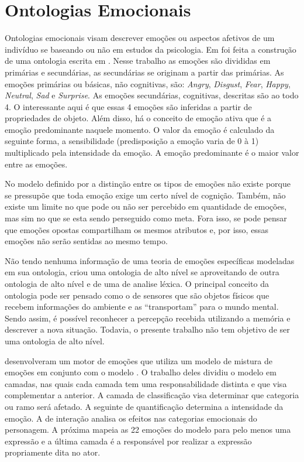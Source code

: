 \section{Ontologias Emocionais} \label{cap:eda:oe}

Ontologias emocionais visam descrever emoções ou aspectos afetivos de um
indivíduo se baseando ou não em estudos da psicologia. Em
\citet{benta2007ontology} foi feita a construção de uma ontologia escrita em
\OWL. Nesse trabalho as emoções são divididas em primárias e secundárias, as
secundárias se originam a partir das primárias. As emoções primárias ou
básicas, não cognitivas, são: \emph{Angry}, \emph{Disgust}, \emph{Fear},
\emph{Happy}, \emph{Neutral}, \emph{Sad} e \emph{Surprise}. As emoções
secundárias, cognitivas, descritas são ao todo 4. O interessante aqui é que
essas 4 emoções são inferidas a partir de propriedades de objeto. Além disso,
há o conceito de emoção ativa que é a emoção predominante naquele momento. O
valor da emoção é calculado da seguinte forma, a sensibilidade (predisposição
a emoção varia de 0 à 1) multiplicado pela intensidade da emoção. A emoção
predominante é o maior valor entre as emoções.

No modelo definido por \citet{ortony1988cse} a distinção entre os tipos de
emoções não existe porque se pressupõe que toda emoção exige um certo nível de
cognição. Também, não existe um limite no que pode ou não ser percebido em
quantidade de emoções, mas sim no que se esta sendo perseguido como meta. Fora
isso, se pode pensar que emoções opostas compartilham os mesmos atributos e,
por isso, essas emoções não serão sentidas ao mesmo tempo.

Não tendo nenhuma informação de uma teoria de emoções específicas modeladas em
sua ontologia, \citet{wks2008towards} criou uma ontologia de alto nível se
aproveitando de outra ontologia de alto nível e de uma de analise léxica. O
principal conceito da ontologia pode ser pensado como o de sensores que são
objetos físicos que recebem informações do ambiente e as ``transportam'' para
o mundo mental. Sendo assim, é possível reconhecer a percepção recebida
utilizando a memória e descrever a nova situação. Todavia, o presente trabalho
não tem objetivo de ser uma ontologia de alto nível\dev{}.

\citet{springerlink:10.1007/978-3-642-01639-448} desenvolveram um motor de
emoções que utiliza um modelo de mistura de emoções em conjunto com o modelo
\occ. O trabalho deles dividiu o modelo em camadas, nas quais cada camada tem
uma responsabilidade distinta e que visa complementar a anterior. A
camada de classificação visa determinar que categoria ou ramo será afetado. A
seguinte de quantificação determina a intensidade da emoção. A de interação
analisa os efeitos nas categorias emocionais do personagem. A próxima mapeia
as 22 emoções do modelo para pelo menos uma expressão e a última camada é a
responsável por realizar a expressão propriamente dita no ator.

